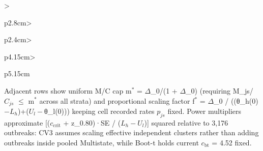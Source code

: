 \begin{table}[!tbp]
\begin{tabular}{>{\raggedright\arraybackslash}p{2.8cm}>{\raggedright\arraybackslash}p{2.4cm}>{\raggedright\arraybackslash}p{4.15cm}>{\raggedright\arraybackslash}p{5.15cm}}
\bottomrule
\end{tabular}
\par\smallskip\parbox{0.97\linewidth}{\footnotesize Adjacent rows show uniform M/C cap m$^{*}$ = $\Delta$\_0/(1 + $\Delta$\_0) (requiring M\_js/$C_{js}$ $\leq$ m$^{*}$ across all strata) and proportional scaling factor f$^{*}$ = $\Delta$\_0 / ((θ\_h(0)$-L_h$)+($U_l-$θ\_l(0))) keeping cell recorded rates $p_{js}$ fixed. Power multipliers approximate [($c_{\mathrm{crit}}$ + z\_0.80)·SE / ($L_h-U_l$)] squared relative to 3,176 outbreaks: CV3 assumes scaling effective independent clusters rather than adding outbreaks inside pooled Multistate, while Boot-t holds current $c_{\mathrm{bt}}$ = 4.52 fixed.}
\end{table}
